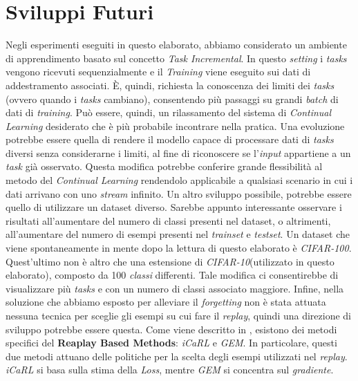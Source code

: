 \section{Sviluppi Futuri}
Negli esperimenti eseguiti in questo elaborato, abbiamo considerato un ambiente di apprendimento basato sul concetto \textit{Task Incremental}. In questo \textit{setting} i \textit{tasks} vengono ricevuti sequenzialmente e il \textit{Training}  viene eseguito sui dati di addestramento associati. È, quindi, richiesta la conoscenza dei limiti dei \textit{tasks} (ovvero quando i \textit{tasks} cambiano), consentendo più passaggi su grandi \textit{batch} di dati di \textit{training}. Può essere, quindi, un rilassamento del sistema di \textit{Continual Learning} desiderato che è più probabile incontrare nella pratica. Una evoluzione potrebbe essere quella di rendere il modello capace di processare dati di \textit{tasks} diversi senza considerarne i limiti, al fine di riconoscere se l'\textit{input} appartiene a un \textit{task} già osservato. Questa modifica potrebbe conferire grande flessibilità al metodo del \textit{Continual Learning} rendendolo applicabile a qualsiasi scenario in cui i dati arrivano con uno \textit{stream} infinito.
\newline
Un altro sviluppo possibile, potrebbe essere quello di utilizzare un dataset diverso. Sarebbe appunto interessante osservare i risultati all'aumentare del numero di classi presenti nel dataset, o altrimenti, all'aumentare del numero di esempi presenti nel \textit{trainset} e \textit{testset}. Un dataset che viene spontaneamente in mente dopo la lettura di questo elaborato è \textit{CIFAR-100}. Quest'ultimo non è altro che una estensione di \textit{CIFAR-10}(utilizzato in questo elaborato), composto da 100 \textit{classi} differenti. Tale modifica ci consentirebbe di visualizzare più \textit{tasks} e con un numero di classi associato maggiore.\newline
Infine, nella soluzione che abbiamo esposto per alleviare il \textit{forgetting} non è stata attuata nessuna tecnica per sceglie gli esempi su cui fare il \textit{replay}, quindi una direzione di sviluppo potrebbe essere questa. Come viene descritto in \cite{Continual_Learning}, esistono dei metodi specifici del \textbf{Reaplay Based Methods}:
\textit{iCaRL} e \textit{GEM}. In particolare, questi due metodi attuano delle politiche per la scelta degli esempi utilizzati nel \textit{replay}.
\textit{iCaRL} si basa sulla stima della \textit{Loss}, mentre \textit{GEM} si concentra sul \textit{gradiente}.